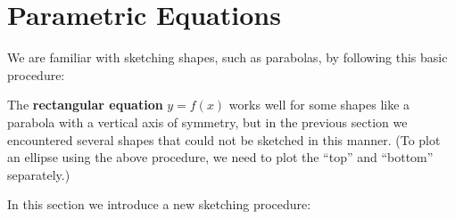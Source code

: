 \section{Parametric Equations}\label{sec:param_eqs}

We are familiar with sketching  shapes, such as parabolas, by following this basic procedure:


The \textbf{rectangular equation} $y=f(x)$ works well for some shapes like a parabola with a vertical axis of symmetry, but in the previous section we encountered several shapes that could not be sketched in this manner. (To plot an ellipse using the above procedure, we need to plot the ``top'' and ``bottom'' separately.)

In this section we introduce a new sketching procedure:

